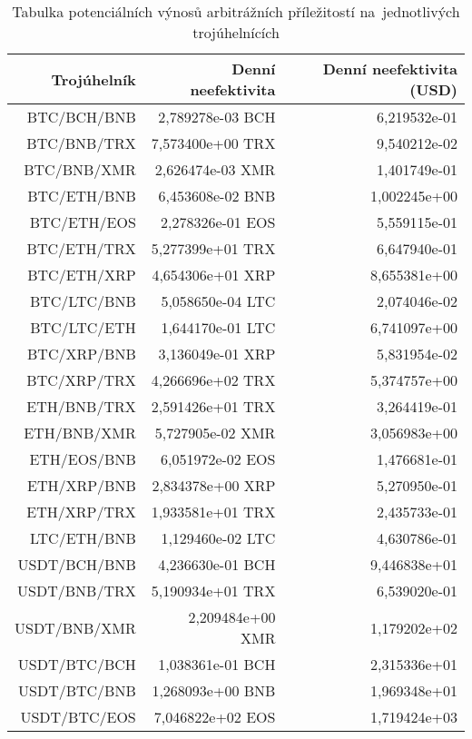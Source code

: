 \begin{table}\centering
\caption{Tabulka potenciálních výnosů arbitrážních příležitostí na~jednotlivých trojúhelnících}
\label{table_gains}
\begin{tabular}{|| r | r | r ||}\hline Trojúhelník & Denní neefektivita & Denní neefektivita (USD)\\ [0.5ex]
 \hline\hline BTC/BCH/BNB & 2,789278e-03 BCH & 6,219532e-01\\ 
 \hline BTC/BNB/TRX & 7,573400e+00 TRX & 9,540212e-02\\ 
 \hline BTC/BNB/XMR & 2,626474e-03 XMR & 1,401749e-01\\ 
 \hline BTC/ETH/BNB & 6,453608e-02 BNB & 1,002245e+00\\ 
 \hline BTC/ETH/EOS & 2,278326e-01 EOS & 5,559115e-01\\ 
 \hline BTC/ETH/TRX & 5,277399e+01 TRX & 6,647940e-01\\ 
 \hline BTC/ETH/XRP & 4,654306e+01 XRP & 8,655381e+00\\ 
 \hline BTC/LTC/BNB & 5,058650e-04 LTC & 2,074046e-02\\ 
 \hline BTC/LTC/ETH & 1,644170e-01 LTC & 6,741097e+00\\ 
 \hline BTC/XRP/BNB & 3,136049e-01 XRP & 5,831954e-02\\ 
 \hline BTC/XRP/TRX & 4,266696e+02 TRX & 5,374757e+00\\ 
 \hline ETH/BNB/TRX & 2,591426e+01 TRX & 3,264419e-01\\ 
 \hline ETH/BNB/XMR & 5,727905e-02 XMR & 3,056983e+00\\ 
 \hline ETH/EOS/BNB & 6,051972e-02 EOS & 1,476681e-01\\ 
 \hline ETH/XRP/BNB & 2,834378e+00 XRP & 5,270950e-01\\ 
 \hline ETH/XRP/TRX & 1,933581e+01 TRX & 2,435733e-01\\ 
 \hline LTC/ETH/BNB & 1,129460e-02 LTC & 4,630786e-01\\ 
 \hline USDT/BCH/BNB & 4,236630e-01 BCH & 9,446838e+01\\ 
 \hline USDT/BNB/TRX & 5,190934e+01 TRX & 6,539020e-01\\ 
 \hline USDT/BNB/XMR & 2,209484e+00 XMR & 1,179202e+02\\ 
 \hline USDT/BTC/BCH & 1,038361e-01 BCH & 2,315336e+01\\ 
 \hline USDT/BTC/BNB & 1,268093e+00 BNB & 1,969348e+01\\ 
 \hline USDT/BTC/EOS & 7,046822e+02 EOS & 1,719424e+03\\ 

\end{tabular}
\end{table}
